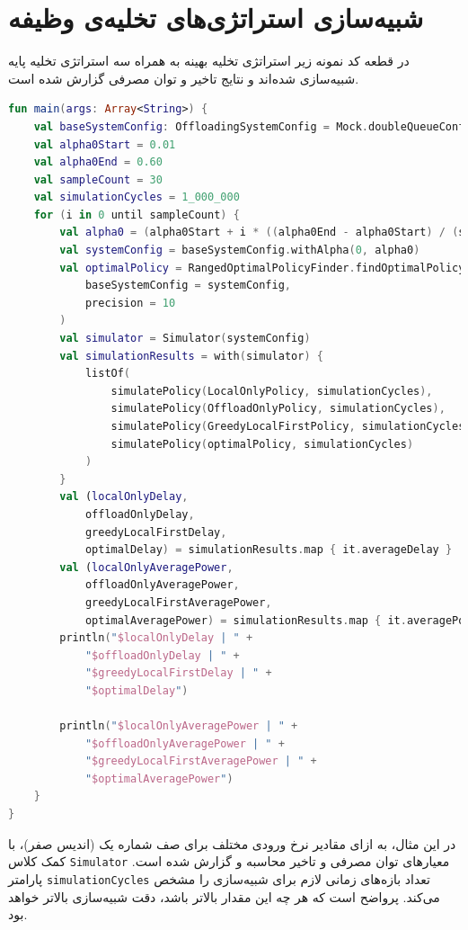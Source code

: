 \section{شبیه‌سازی استراتژی‌های تخلیه‌ی وظیفه}
در قطعه کد نمونه زیر استراتژی تخلیه بهینه به همراه سه استراتژی تخلیه پایه شبیه‌سازی شده‌اند و نتایج تاخیر و توان مصرفی گزارش شده است.
\begin{LTR}
	\begin{lstlisting}[language=Kotlin, caption={شبیه‌سازی استراتژی‌های تخلیه‌ی وظیفه}, captiondirection=RTL, label={lst:sim}, showstringspaces=false]
fun main(args: Array<String>) {
	val baseSystemConfig: OffloadingSystemConfig = Mock.doubleQueueConfig()
	val alpha0Start = 0.01
	val alpha0End = 0.60
	val sampleCount = 30
	val simulationCycles = 1_000_000
	for (i in 0 until sampleCount) {
		val alpha0 = (alpha0Start + i * ((alpha0End - alpha0Start) / (sampleCount - 1)))
		val systemConfig = baseSystemConfig.withAlpha(0, alpha0)
		val optimalPolicy = RangedOptimalPolicyFinder.findOptimalPolicy(
			baseSystemConfig = systemConfig,
			precision = 10
		)
		val simulator = Simulator(systemConfig)
		val simulationResults = with(simulator) {
			listOf(
				simulatePolicy(LocalOnlyPolicy, simulationCycles),
				simulatePolicy(OffloadOnlyPolicy, simulationCycles),
				simulatePolicy(GreedyLocalFirstPolicy, simulationCycles),
				simulatePolicy(optimalPolicy, simulationCycles)
			)
		}
		val (localOnlyDelay,
			offloadOnlyDelay,
			greedyLocalFirstDelay,
			optimalDelay) = simulationResults.map { it.averageDelay }
		val (localOnlyAveragePower,
			offloadOnlyAveragePower,
			greedyLocalFirstAveragePower,
			optimalAveragePower) = simulationResults.map { it.averagePowerConsumption }
		println("$localOnlyDelay | " +
			"$offloadOnlyDelay | " +
			"$greedyLocalFirstDelay | " +
			"$optimalDelay")
		
		println("$localOnlyAveragePower | " +
			"$offloadOnlyAveragePower | " +
			"$greedyLocalFirstAveragePower | " +
			"$optimalAveragePower")
	}
}
	\end{lstlisting}
\end{LTR}
در این مثال، به ازای مقادیر نرخ ورودی مختلف برای صف شماره یک (اندیس صفر)، با کمک کلاس \texttt{\footnotesize Simulator} معیارهای توان مصرفی و تاخیر محاسبه و گزارش شده است. پارامتر \texttt{\footnotesize simulationCycles} تعداد بازه‌های زمانی لازم برای شبیه‌سازی را مشخص می‌کند. پرواضح است که هر چه این مقدار بالاتر باشد، دقت شبیه‌سازی بالاتر خواهد بود. 
\newpage